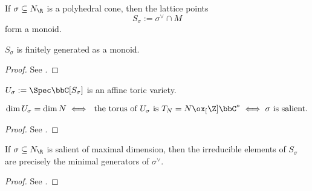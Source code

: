 \begin{definition}
  \label{1-2-17-dual-lat-cone}

  If $\sigma \subseteq N_\R$ is a polyhedral cone, then the lattice points
  \[
    S_\sigma := \sigma^\vee \cap M
  \]
  form a monoid.
\end{definition}


\begin{proposition}
  \label{1-2-17-gordan-lemma}

  $S_\sigma$ is finitely generated as a monoid.
\end{proposition}
\begin{proof}

  See \cite{Cox_2011}.
\end{proof}


\begin{definition}
  \label{1-2-18-aff-tor-var-rat-polyhedral-cone}

  $U_\sigma := \Spec \bbC[S_\sigma]$ is an affine toric variety.
\end{definition}


\begin{theorem}
  \label{1-2-18-dim-aff-tor-var-rat-polyhedral-cone}

  \[
    \dim U_\sigma = \dim N \iff \text{ the torus of $U_\sigma$ is } T_N = N \ox_[\Z] \bbC^* \iff \sigma \text{ is salient}.
  \]
\end{theorem}
\begin{proof}

  See \cite{Cox_2011}.
\end{proof}


\begin{proposition}
  \label{1-2-22-irred-dual-lat}

  If $\sigma \subseteq N_\R$ is salient of maximal dimension, then the irreducible elements of $S_\sigma$ are precisely the minimal generators of $\sigma^\vee$.
\end{proposition}
\begin{proof}

  See \cite{Cox_2011}.
\end{proof}
